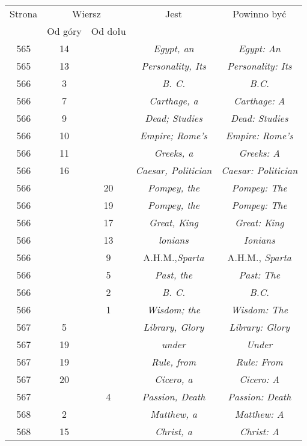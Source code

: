 \documentclass[a4paper,11pt]{article}
\begin{document}
\begin{center}
  \begin{tabular}{|c|c|c|c|c|}
    \hline
    Strona & \multicolumn{2}{c|}{Wiersz} & Jest
                              & Powinno być \\ \cline{2-3}
    & Od góry & Od dołu & & \\
    \hline
    565 & 14 & & \textit{Egypt, an} & \textit{Egypt: An} \\
    565 & 13 & & \textit{Personality, Its} & \textit{Personality: Its} \\
    566 &  3 & & \textit{B. C.} & \textit{B.C.} \\
    566 &  7 & & \textit{Carthage, a} & \textit{Carthage: A} \\
    566 &  9 & & \textit{Dead; Studies} & \textit{Dead: Studies} \\
    566 & 10 & & \textit{Empire; Rome's} & \textit{Empire: Rome's} \\
    566 & 11 & & \textit{Greeks, a} & \textit{Greeks: A} \\
    566 & 16 & & \textit{Caesar, Politician}
           & \textit{Caesar: Politician} \\
    566 & & 20 & \textit{Pompey, the} & \textit{Pompey: The} \\
    566 & & 19 & \textit{Pompey, the} & \textit{Pompey: The} \\
    566 & & 17 & \textit{Great, King} & \textit{Great: King} \\
    566 & & 13 & \textit{lonians} & \textit{Ionians} \\
    566 & &  9 & A.H.M.,\textit{Sparta} & A.H.M., \textit{Sparta} \\
    566 & &  5 & \textit{Past, the} & \textit{Past: The} \\
    566 & &  2 & \textit{B. C.} & \textit{B.C.} \\
    566 & &  1 & \textit{Wisdom; the} & \textit{Wisdom: The} \\
    567 &  5 & & \textit{Library, Glory} & \textit{Library: Glory} \\
    567 & 19 & & \textit{under} & \textit{Under} \\
    567 & 19 & & \textit{Rule, from} & \textit{Rule: From} \\
    567 & 20 & & \textit{Cicero, a} & \textit{Cicero: A} \\
    567 & &  4 & \textit{Passion, Death} & \textit{Passion: Death} \\
    568 &  2 & & \textit{Matthew, a} & \textit{Matthew: A} \\
    568 & 15 & & \textit{Christ, a} & \textit{Christ: A} \\

\end{tabular}
\end{center}
\end{document}
